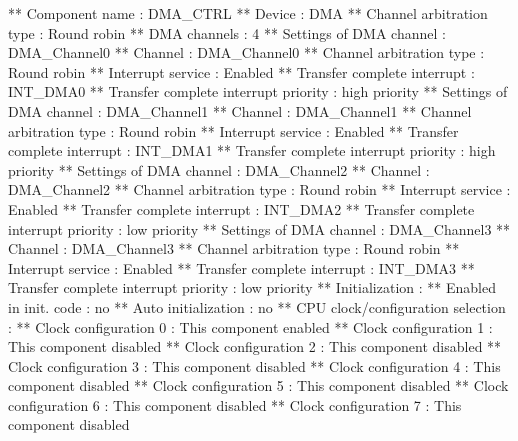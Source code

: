 \begin{DoxyCode}
**          Component name                                 : DMA\_CTRL
**          Device                                         : DMA
**          Channel arbitration type                       : Round robin
**          DMA channels                                   : 4
**            Settings of DMA channel                      : DMA\_Channel0
**              Channel                                    : DMA\_Channel0
**              Channel arbitration type                   : Round robin
**              Interrupt service                          : Enabled
**                Transfer complete interrupt              : INT\_DMA0
**                Transfer complete interrupt priority     : high priority
**            Settings of DMA channel                      : DMA\_Channel1
**              Channel                                    : DMA\_Channel1
**              Channel arbitration type                   : Round robin
**              Interrupt service                          : Enabled
**                Transfer complete interrupt              : INT\_DMA1
**                Transfer complete interrupt priority     : high priority
**            Settings of DMA channel                      : DMA\_Channel2
**              Channel                                    : DMA\_Channel2
**              Channel arbitration type                   : Round robin
**              Interrupt service                          : Enabled
**                Transfer complete interrupt              : INT\_DMA2
**                Transfer complete interrupt priority     : low priority
**            Settings of DMA channel                      : DMA\_Channel3
**              Channel                                    : DMA\_Channel3
**              Channel arbitration type                   : Round robin
**              Interrupt service                          : Enabled
**                Transfer complete interrupt              : INT\_DMA3
**                Transfer complete interrupt priority     : low priority
**          Initialization                                 : 
**            Enabled in init. code                        : no
**            Auto initialization                          : no
**          CPU clock/configuration selection              : 
**            Clock configuration 0                        : This component enabled
**            Clock configuration 1                        : This component disabled
**            Clock configuration 2                        : This component disabled
**            Clock configuration 3                        : This component disabled
**            Clock configuration 4                        : This component disabled
**            Clock configuration 5                        : This component disabled
**            Clock configuration 6                        : This component disabled
**            Clock configuration 7                        : This component disabled
\end{DoxyCode}
